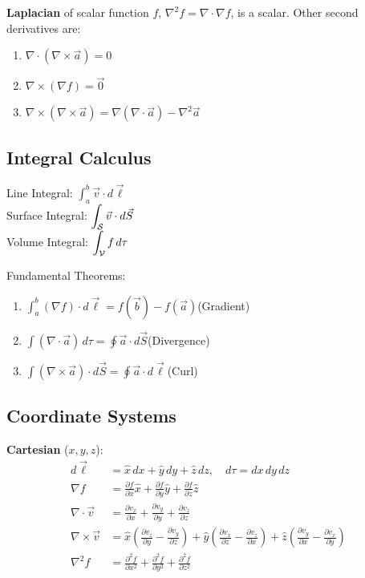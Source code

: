 \documentclass[12pt, a4paper]{article}
\begin{document}
\begin{multicols*}{3}
\textbf{Laplacian} of scalar function $f$, $\nabla^2 f = \nabla \cdot \nabla f$, is a scalar. Other second derivatives are:
\begin{enumerate}[\roman*.]
  \item $\nabla \cdot (\nabla \times \vec{a}) = 0$
  \item $\nabla \times (\nabla f) = \vec{0}$
  \item $\nabla \times (\nabla \times \vec{a}) = \nabla(\nabla \cdot \vec{a}) - \nabla^2 \vec{a}$
\end{enumerate}
\subsection{Integral Calculus}

Line Integral: $\displaystyle\int^b_a \vec{v}\cdot d\vec{\ell}$\\
Surface Integral: $\displaystyle\int_{\mathcal{S}} \vec{v}\cdot d\vec{S}$\\
Volume Integral: $\displaystyle\int_{\mathcal{V}} f\,d\tau$

Fundamental Theorems:
\begin{enumerate}[\roman*.]
  \item $\displaystyle\int^b_a (\nabla f)\cdot d\vec{\ell} = f(\vec{b}) - f(\vec{a})$\hfill(Gradient)
  \item $\displaystyle\int(\nabla\cdot \vec{a})\,d\tau = \oint \vec{a}\cdot d \vec{S}$\hfill(Divergence)
  \item $\displaystyle\int(\nabla\times \vec{a})\cdot d \vec{S} = \oint \vec{a}\cdot d \vec{\ell}$\hfill(Curl)
\end{enumerate}
\vspace{-1em}
\colbreak
\subsection{Coordinate Systems}

\textbf{Cartesian} ($x, y, z$):
\begin{align*}
  d\vec{\ell} &= \hat{x}\,dx + \hat{y}\,dy + \hat{z}\,dz,\quad d\tau = dx\,dy\,dz\\
  \nabla f &= \frac{\partial f}{\partial x}\hat{x} + \frac{\partial f}{\partial y}\hat{y} + \frac{\partial f}{\partial z}\hat{z}\\
  \nabla \cdot \vec{v} &= \frac{\partial v_x}{\partial x} + \frac{\partial v_y}{\partial y} + \frac{\partial v_z}{\partial z}\\
  \nabla \times \vec{v} &= \hat{x}(\frac{\partial v_z}{\partial y} - \frac{\partial v_y}{\partial z}) + \hat{y}(\frac{\partial v_x}{\partial z} - \frac{\partial v_z}{\partial x}) + \hat{z}(\frac{\partial v_y}{\partial x} - \frac{\partial v_x}{\partial y})\\
    \nabla^2f &= \frac{\partial^2f}{\partial x^2} + \frac{\partial^2f}{\partial y^2} + \frac{\partial^2f}{\partial z^2}
\end{align*}


\end{multicols*}
\end{document}
